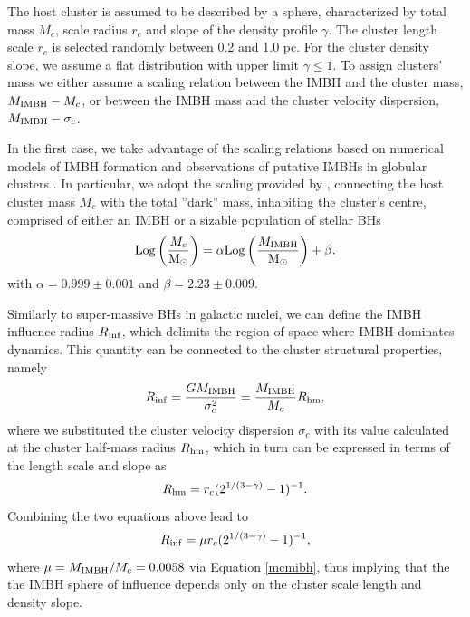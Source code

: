 \documentclass[useAMS,usenatbib]{mn2e}
\newcommand{\Log}{{\rm Log}}
\newcommand{\Ms}{{\rm M}_\odot}
\newcommand{\ibh}{{\rm IMBH}}
\begin{document}
The host cluster is assumed to be described by a \cite{Deh93} sphere, characterized by 
total mass $M_c$, scale radius $r_c$ and slope of the density profile $\gamma$.
The cluster length scale $r_c$ is selected randomly between 0.2 and 1.0 pc. For the cluster density slope, we assume a flat distribution with upper limit $\gamma \leq 1$.
To assign clusters' mass we either assume a scaling relation between the IMBH and the cluster mass, $M_\ibh - M_c$, or between the IMBH mass and the cluster velocity dispersion, $M_\ibh-\sigma_c$. 

In the first case, we take advantage of the scaling relations based on numerical models of IMBH formation and observations of putative IMBHs in globular clusters \citep{zwart02,Lutzgendorf13,AS16}. In particular, we adopt the scaling provided by \cite{AS16}, connecting the host cluster mass $M_c$ with the total ''dark'' mass, inhabiting the cluster's centre, comprised of either an IMBH or a sizable population of stellar BHs
\begin{equation}
\Log \left(\frac{M_c}{\Ms}\right) = \alpha \Log \left(\frac{M_\ibh}{\Ms}\right) + \beta.
\label{mcmibh}
\end{equation}
with $\alpha = 0.999 \pm 0.001$ and $\beta = 2.23 \pm 0.009$. 

Similarly to super-massive BHs in galactic nuclei, we can define the IMBH influence radius $R_{\rm inf}$, which delimits the region of space where IMBH dominates dynamics. This quantity can be connected to the cluster structural properties, namely
 \begin{equation}
 R_{\rm inf} = \frac{GM_\ibh}{\sigma_c^2} = \frac{M_\ibh}{M_c}R_{\rm hm},
 \end{equation}
 where we substituted the cluster velocity dispersion $\sigma_c$ with its value calculated at the cluster half-mass radius $R_{\rm hm}$, which in turn can be expressed in terms of the length scale and slope as
\begin{equation}
R_{\rm hm} = r_c(2^{1/(3-\gamma)}-1)^{-1}.
\end{equation} 
Combining the two equations above lead to 
\begin{equation}
R_{\rm inf} = \mu r_c(2^{1/(3-\gamma)}-1)^{-1},
\end{equation}
where $\mu = M_\ibh/M_c = 0.0058$ via Equation \ref{mcmibh}, thus implying that the the IMBH sphere of influence depends only on the cluster scale length and density slope. 
\end{document}
